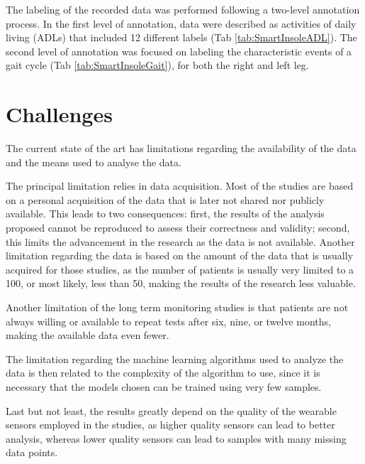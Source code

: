 The labeling of the recorded data was performed following a two-level annotation process. In the first level of annotation, data were described as activities of daily living (ADLs) that included 12 different labels (Tab \ref{tab:SmartInsoleADL}). The second level of annotation was focused on labeling the characteristic events of a gait cycle (Tab \ref{tab:SmartInsoleGait}), for both the right and left leg. 

\FloatBarrier


\FloatBarrier
\section{Challenges}
The current state of the art has limitations regarding the availability of the data and the means used to analyse the data.

The principal limitation relies in data acquisition. Most of the studies are based on a personal acquisition of the data that is later not shared nor publicly available. This leads to two consequences: first, the results of the analysis proposed cannot be reproduced to assess their correctness and validity; second, this limits the advancement in the research as the data is not available.
Another limitation regarding the data is based on the amount of the data that is usually acquired for those studies, as the number of patients is usually very limited to a 100, or most likely, less than 50, making the results of the research less valuable.

Another limitation of the long term monitoring studies is that patients are not always willing or available to repeat tests after six, nine, or twelve months, making the available data even fewer. 

The limitation regarding the machine learning algorithms used to analyze the data is then related to the complexity of the algorithm to use, since it is necessary that the models chosen can be trained using very few samples. 

Last but not least, the results greatly depend on the quality of the wearable sensors employed in the studies, as higher quality sensors can lead to better analysis, whereas lower quality sensors can lead to samples with many missing data points.

